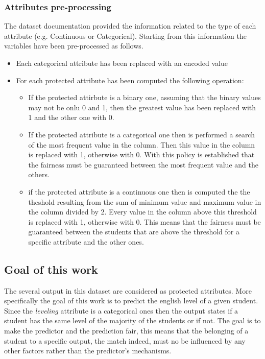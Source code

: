 \documentclass[12pt,a4paper,openright,twoside]{book}
\begin{document}
\subsubsection{Attributes pre-processing}
The dataset documentation provided the information related to the type of each attribute (e.g. Continuous or Categorical). Starting from this information the variables have been pre-processed as follows.
\begin{itemize}
    \item Each categorical attribute has been replaced with an encoded value
    \item For each protected attribute has been computed the following operation:
    \begin{itemize}
        \item If the protected attirbute is a binary one, assuming that the binary values may not be onlu 0 and 1, then the greatest value has been replaced with 1 and the other one with 0.
        \item If the protected attribute is a categorical one then is performed a search of the most frequent value in the column. Then this value in the column is replaced with 1, otherwise with 0. With this policy is established that the fairness must be guaranteed between the most frequent value and the others.
        \item if the protected attribute is a continuous one then is computed the the theshold resulting from the sum of minimum value and maximum value in the column divided by 2. Every value in the column above this threshold is replaced with 1, otherwise with 0. This means that the fairness must be guaranteed between the students that are above the threshold for a specific attribute and the other ones.
    \end{itemize}
\end{itemize}

\subsection{Goal of this work}
The several output in this dataset are considered as protected attributes. More specifically the goal of this work is to predict the english level of a given student. Since the \emph{level\textunderscore ing} attribute is a categorical ones then the output states if a student has the same level of the majority of the students or if not. The goal is to make the predictor and the prediction fair, this means that the belonging of a student to a specific output, the match indeed, must no be influenced by any other factors rather than the predictor's mechanisms.
\newpage
\end{document}
